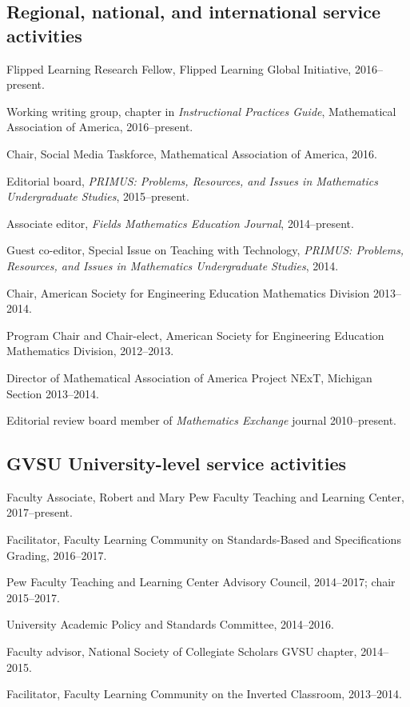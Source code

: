 \documentclass[letterpaper]{article}
\renewenvironment{itemize}{
  \begin{list}{}{
    \setlength{\leftmargin}{1.5em}
	\setlength{\itemsep}{0in}
  }
}{
  \end{list}
}
\begin{document}
\subsection*{Regional, national, and international service activities}
\begin{itemize}
	\item Flipped Learning Research Fellow, Flipped Learning Global Initiative, 2016--present.
	\item Working writing group, chapter in \textit{Instructional Practices Guide}, Mathematical Association of America, 2016--present.
	\item Chair, Social Media Taskforce, Mathematical Association of America, 2016.
	\item Editorial board, \emph{PRIMUS: Problems, Resources, and Issues in Mathematics Undergraduate Studies}, 2015--present.
	\item Associate editor, \emph{Fields Mathematics Education Journal}, 2014--present.
	\item Guest co-editor, Special Issue on Teaching with Technology, \emph{PRIMUS: Problems, Resources, and Issues in Mathematics Undergraduate Studies}, 2014.
	\item Chair, American Society for Engineering Education Mathematics Division 2013--2014.
	\item Program Chair and Chair-elect, American Society for Engineering Education Mathematics Division, 2012--2013.
	\item Director of Mathematical Association of America Project NExT, Michigan Section 2013--2014.
	\item Editorial review board member of \emph{Mathematics Exchange} journal 2010--present.
\end{itemize}

\subsection*{GVSU University-level service activities}

\begin{itemize}
  \item Faculty Associate, Robert and Mary Pew Faculty Teaching and Learning Center, 2017--present.
	\item Facilitator, Faculty Learning Community on Standards-Based and Specifications Grading, 2016--2017.
	\item Pew Faculty Teaching and Learning Center Advisory Council, 2014--2017; chair 2015--2017.
	\item University Academic Policy and Standards Committee, 2014--2016.
	\item Faculty advisor, National Society of Collegiate Scholars GVSU chapter, 2014--2015.
	\item Facilitator, Faculty Learning Community on the Inverted Classroom, 2013--2014.
\end{itemize}
\end{document}
